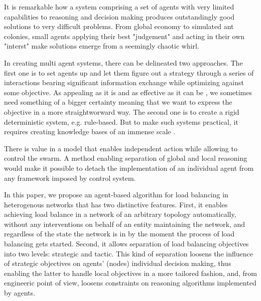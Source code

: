 It is remarkable how a system comprising a set of agents with very limited capabilities to reasoning and decision making produces outstandingly good solutions to very difficult problems.
From global economy to simulated ant colonies, small agents applying their best "judgement" and acting in their own "interst" make solutions emerge from a seemingly chaotic whirl.

In creating multi agent systems, there can be delineated two approaches.
The first one is to set agents up and let them figure out a strategy through a series of interactions bearing significant information exchange while optimizing against some objective.
As appealing as it is and as effective as it can be \cite{dorigo-2006}, we sometimes need something of a bigger certainty meaning that we want to express the objective in a more straightworward way.
The second one is to create a rigid deterministic system, e.g. rule-based.
But to make such systems practical, it requires creating knowledge bases of an immense scale \cite{lenat-2022}.

There is value in a model that enables independent action while allowing to control the swarm.
A method enabling separation of global and local reasoning would make it possible to detach the implementation of an individual agent from any framework imposed by control system.

In this paper, we propose an agent-based algorithm for load balancing in heterogenous networks that has two distinctive features.
First, it enables achieving load balance in a network of an arbitrary topology automatically, without any interventions on behalf of an entity maintaining the network, and regardless of the state the network is in by the moment the process of load balancing gets started.
Second, it allows separation of load balancing objectives into two levels: strategic and tactic.
This kind of separation loosens the influence of strategic objectives on  agents' (nodes) individual decision making, thus enabling the latter to handle local objectives in a more tailored fashion, and, from engineeric point of view, loosens constraints on reasoning algorithms implemented by agents.
